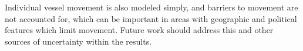 Individual vessel movement is also modeled simply, and barriers to movement are not accounted for, which can be important in areas with geographic and political features which limit movement. Future work should address this and other sources of uncertainty within the results.







